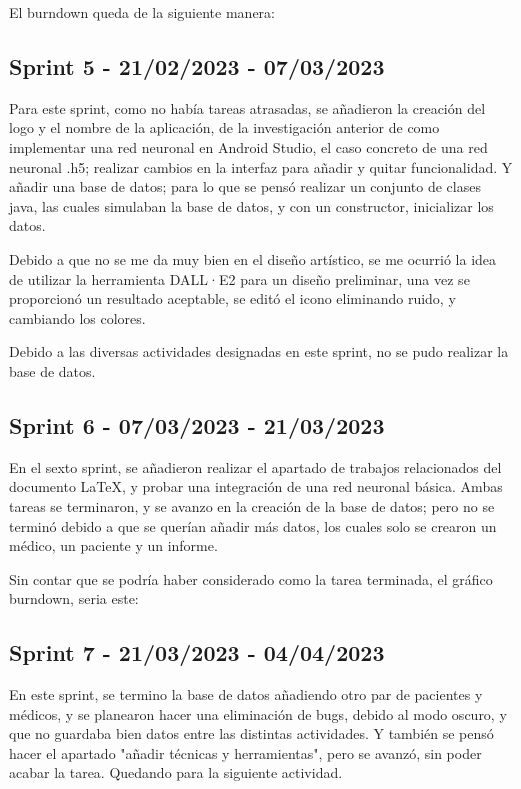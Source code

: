 El burndown queda de la siguiente manera:

\subsection{Sprint 5 - 21/02/2023 - 07/03/2023}
Para este sprint, como no había tareas atrasadas, se añadieron la creación del logo y el nombre de la aplicación, de la investigación anterior de como implementar una red neuronal en Android Studio, el caso concreto de una red neuronal .h5; realizar cambios en la interfaz para añadir y quitar funcionalidad. Y añadir una base de datos; para lo que se pensó realizar un conjunto de clases java, las cuales simulaban la base de datos, y con un constructor, inicializar los datos.

Debido a que no se me da muy bien en el diseño artístico, se me ocurrió la idea de utilizar la herramienta DALL·E2 para un diseño preliminar, una vez se proporcionó un resultado aceptable, se editó el icono eliminando ruido, y cambiando los colores.

Debido a las diversas actividades designadas en este sprint, no se pudo realizar la base de datos.

\subsection{Sprint 6 - 07/03/2023 - 21/03/2023}
En el sexto sprint, se añadieron realizar el apartado de trabajos relacionados del documento LaTeX, y probar una integración de una red neuronal básica.
Ambas tareas se terminaron, y se avanzo en la creación de la base de datos; pero no se terminó debido a que se querían añadir más datos, los cuales solo se crearon un médico, un paciente y un informe.

Sin contar que se podría haber considerado como la tarea terminada, el gráfico burndown, seria este:

\subsection{Sprint 7 - 21/03/2023 - 04/04/2023}
En este sprint, se termino la base de datos añadiendo otro par de pacientes y médicos, y se planearon hacer una eliminación de bugs, debido al modo oscuro, y que no guardaba bien datos entre las distintas actividades. Y también se pensó hacer el apartado "añadir técnicas y herramientas", pero se avanzó, sin poder acabar la tarea. Quedando para la siguiente actividad.

